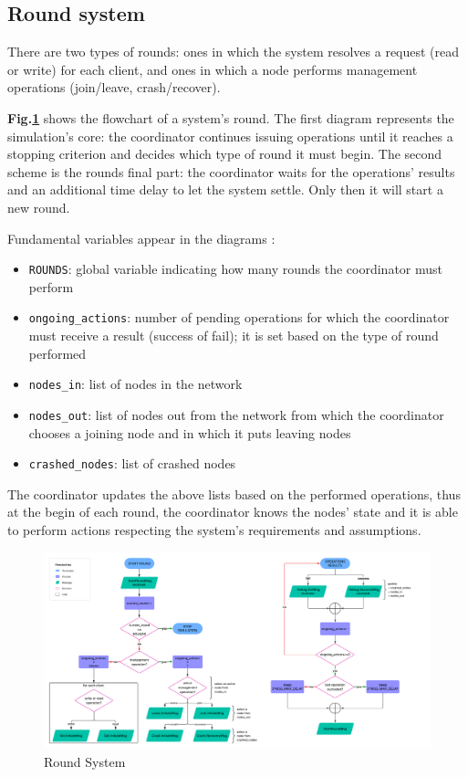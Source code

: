 \documentclass{article}
\begin{document}
\subsection{Round system}
There are two types of rounds: ones in which the system resolves a request (read
or write) for each client, and ones in which a node performs management 
operations (join/leave, crash/recover).

\textbf{Fig.\ref{fig:round_sys}} shows the flowchart of a system's round. The first 
diagram represents the simulation's core: the coordinator continues 
issuing operations until it reaches a stopping criterion 
and decides which type of round it must begin. The second scheme is the rounds 
final part: the coordinator waits for the operations' results and an additional 
time delay to let the system settle. Only then it will start a new round.

Fundamental variables appear in the diagrams :
\begin{itemize}
    \item \texttt{ROUNDS}: global variable indicating how many rounds the 
    coordinator must perform
    \item \texttt{ongoing\_actions}: number of pending operations for which the 
    coordinator must receive a result (success of fail); it is set based on the 
    type of round performed
    \item \texttt{nodes\_in}: list of nodes in the network
    \item \texttt{nodes\_out}: list of nodes out from the network from which the 
    coordinator chooses a joining node and in which it puts leaving nodes
    \item \texttt{crashed\_nodes}: list of crashed nodes
\end{itemize}

The coordinator updates the above lists based on the performed operations, thus 
at the begin of each round, the coordinator knows the nodes' state and it is 
able to perform actions respecting the system's requirements and assumptions.

\begin{figure}[ht!]
    \centering
    \includegraphics[width=1\linewidth]{images/round_sys.png}
    \caption{Round System}
    \label{fig:round_sys}
\end{figure}
\end{document}
